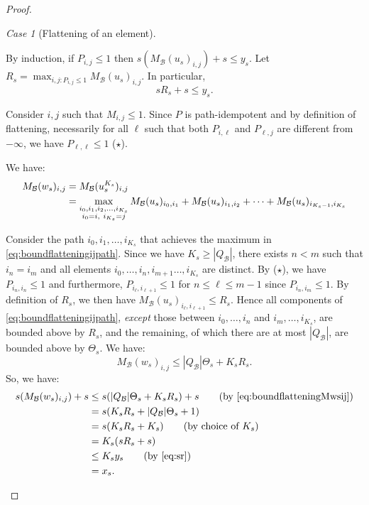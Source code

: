 \documentclass[10pt,a4paper]{amsart}
\theoremstyle{definition}
\numberwithin{equation}{section}
\theoremstyle{remark}
\newtheorem{case}{Case}
\newcommand{\autB}{\mathcal{B}}
\theoremstyle{remark}
\begin{document}
\begin{proof}
\begin{case}[Flattening of an element]
\begin{itemize}
By induction, if $P_{i,j} \le 1$ then $s( M_\autB(u_s)_{i,j}) + s \le y_s$. Let $R_s = \displaystyle\max_{i,j : P_{i,j}\le 1} M_\autB(u_s)_{i,j}$. In particular, 
\begin{equation}\label{eq:sr}sR_s + s \le y_s.\end{equation}

Consider $i,j$ such that $M_{i,j}\leq 1$. Since $P$ is path-idempotent and by definition of flattening, necessarily for all $\ell$ such that both $P_{i,\ell}$ and $P_{\ell,j}$ are different from $-\infty$, we have $P_{\ell,\ell} \le 1$ ($\star$).

We have:
\begin{align}M_\autB(w_s)_{i,j} &= M_\autB(u_s^{K_s})_{i,j}  \notag
\\ &= \max_{\substack{i_0,i_{1},i_2,\dots,i_{K_s}\\i_{0}=i,\ i_{K_s}=j }}  M_\autB(u_s)_{i_0,i_1} + M_\autB(u_s)_{i_1,i_2} + \dots + M_\autB(u_s)_{i_{K_s-1},i_{K_s}} \label{eq:boundflatteningijpath}
\end{align}

Consider the path $i_0,i_1,\dots,i_{K_s}$ that achieves the maximum in \cref{eq:boundflatteningijpath}. Since we have $K_s\ge|Q_\autB|$, there exists $n<m$ such that $i_n= i_m$ and all elements $i_0,\dots,i_{n},i_{m+1}\dots,i_{K_s}$ are distinct. By ($\star$), we have $P_{i_n,i_n} \le 1$ and furthermore, $P_{i_\ell,i_{\ell+1}} \le 1$ for $n\le \ell \le m-1$ since $P_{i_n,i_m}\le 1$. By definition of $R_s$, we then have $M_\autB(u_s)_{i_{\ell},i_{\ell+1}} \le R_s$. Hence all components of \cref{eq:boundflatteningijpath}, \emph{except} those between $i_0,\dots,i_n$ and $i_m,\dots,i_{K_s}$, are bounded above by $R_s$, and the remaining, of which there are at most $|Q_\autB|$, are bounded above by $\Theta_s$.
We have: 
\begin{equation}\label{eq:boundflatteningMwsij}M_\autB(w_s)_{i,j} \le |Q_\autB|\Theta_s + K_s R_s.\end{equation}
So, we have:
\begin{align*}
s(M_\autB(w_s)_{i,j}) + s &\le s( |Q_\autB|\Theta_s + K_s R_s) + s \tag{by \cref{eq:boundflatteningMwsij}}
\\&= s(K_s R_s +  |Q_\autB|\Theta_s   +1)
\\&= s(K_s R_s +  K_s)
\tag{by choice of $K_s$}
\\&= K_s (sR_s +  s)
\\&\le K_s y_s  \tag{by \cref{eq:sr}}
\\& = x_s. \tag*{\qed}
\end{align*}
\end{itemize}
\end{case}
\renewcommand{\qed}{}
\end{proof}
\end{document}
